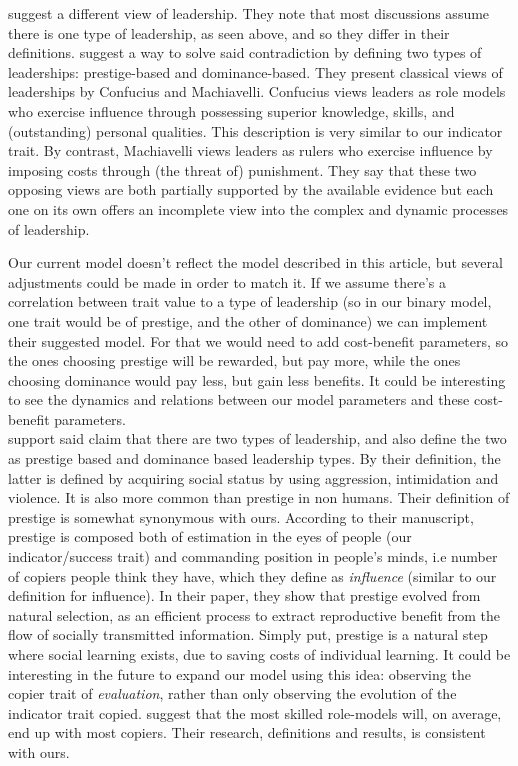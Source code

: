 \documentclass[12pt]{extarticle}
\begin{document}
\citet{dual_leadership} suggest a different view of leadership. They note that most discussions assume there is one type of leadership, as seen above, and so they differ in their definitions. \citet{dual_leadership} suggest a way to solve said contradiction by defining two types of leaderships: prestige-based and dominance-based.
They present classical views of leaderships by Confucius and Machiavelli. Confucius views leaders as role models who exercise influence through possessing superior knowledge, skills,
and (outstanding) personal qualities. This description is very similar to our indicator trait. By contrast, Machiavelli views leaders as rulers who exercise influence by imposing costs through (the threat of) punishment. They say that these two opposing views are both partially supported by the available evidence but each one on its own offers an incomplete view into the complex and dynamic processes of leadership. 

Our current model doesn't reflect the model described in this article, but several adjustments could be made in order to match it. If we assume there's a correlation between trait value to a type of leadership (so in our binary model, one trait would be of prestige, and the other of dominance) we can implement their suggested model. For that we would need to add cost-benefit parameters, so the ones choosing prestige will be rewarded, but pay more, while the ones choosing dominance would pay less, but gain less benefits. It could be interesting to see the dynamics and relations between our model parameters and these cost-benefit parameters.\\

\citet{prestige_evolution} support said claim that there are two types of leadership, and also define the two as prestige based and dominance based leadership types.
By their definition, the latter is defined by acquiring social status by using aggression, intimidation and violence. It is also more common than prestige in non humans. Their definition of prestige is somewhat synonymous with ours. According to their manuscript, prestige is composed both of estimation in the eyes of people (our indicator/success trait) and commanding position in people's minds, i.e number of copiers people think they have, which they define as \textit{influence} (similar to our definition for influence).
In their paper, they show that prestige evolved from natural selection, as an efficient process to extract reproductive benefit from the flow of socially transmitted information. Simply put, prestige is a natural step where social learning exists, due to saving costs of individual learning.
It could be interesting in the future to expand our model using this idea: observing the copier trait of \textit{evaluation}, rather than only observing the evolution of the indicator trait copied.
\citet{prestige_evolution} suggest that the most skilled role-models will, on average, end up with most copiers. Their research, definitions and results, is consistent with ours.\\
\end{document}
